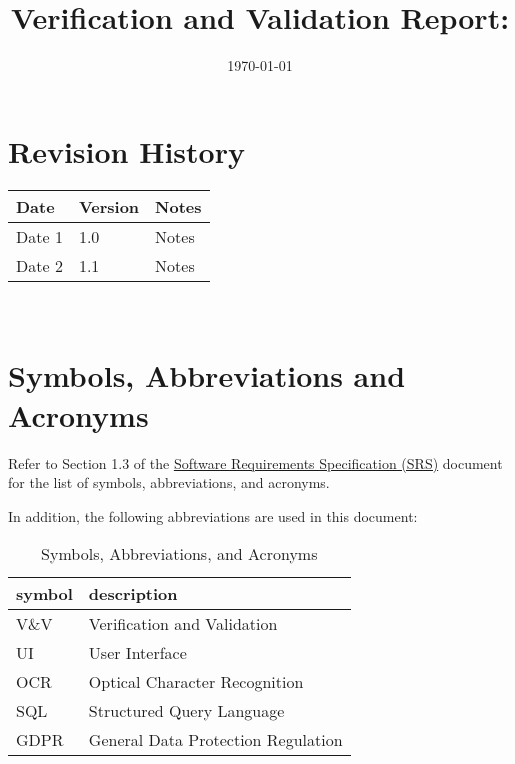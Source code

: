 \documentclass[12pt, titlepage]{article}
\begin{document}
\title{Verification and Validation Report: \progname} 
\author{\authname}
\date{\today}
	
\maketitle


\section{Revision History}

\begin{tabularx}{\textwidth}{p{3cm}p{2cm}X}
\toprule {\bf Date} & {\bf Version} & {\bf Notes}\\
\midrule
Date 1 & 1.0 & Notes\\
Date 2 & 1.1 & Notes\\
\bottomrule
\end{tabularx}

~\newpage

\section{Symbols, Abbreviations and Acronyms}


Refer to Section 1.3 of the
\href{https://github.com/PlutosCapstone/Plutos/blob/main/docs/SRS/SRS.pdf}{Software
Requirements Specification (SRS)} document for the list of symbols,
abbreviations, and acronyms.


In addition, the following abbreviations are used in this document:\\

\renewcommand{\arraystretch}{1.2}
\begin{table}[h!]
\caption{Symbols, Abbreviations, and Acronyms}
\begin{tabularx}{\textwidth}{l l}
  \toprule		
  \textbf{symbol} & \textbf{description}\\
  \midrule 
  V\&V & Verification and Validation\\
  UI & User Interface\\
  OCR & Optical Character Recognition\\
  SQL & Structured Query Language\\
  GDPR & General Data Protection Regulation\\
  \bottomrule
\end{tabularx}
\end{table}
\end{document}
